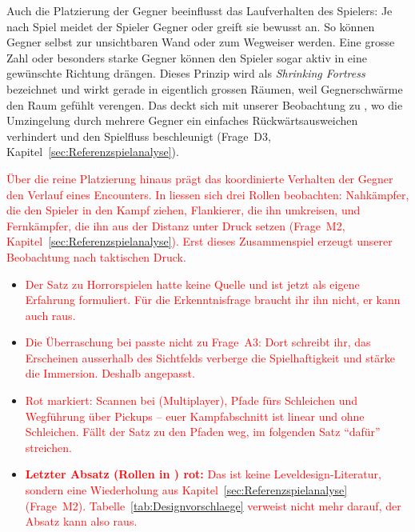 \documentclass[../Main.tex]{subfiles}
\begin{document}
Auch die Platzierung der Gegner beeinflusst das Laufverhalten des Spielers: Je nach Spiel meidet der Spieler Gegner oder greift sie bewusst an. So können Gegner selbst zur unsichtbaren Wand oder zum Wegweiser werden.\autocite[199]{totten2014architectural} Eine grosse Zahl oder besonders starke Gegner können den Spieler sogar aktiv in eine gewünschte Richtung drängen. Dieses Prinzip wird als \textit{Shrinking Fortress} bezeichnet und wirkt gerade in eigentlich grossen Räumen, weil Gegnerschwärme den Raum gefühlt verengen.\autocite[199--200]{totten2014architectural} Das deckt sich mit unserer Beobachtung zu , wo die Umzingelung durch mehrere Gegner ein einfaches Rückwärtsausweichen verhindert und den Spielfluss beschleunigt (Frage~D3, Kapitel~\ref{sec:Referenzspielanalyse}).

\textcolor{red}{Über die reine Platzierung hinaus prägt das koordinierte Verhalten der Gegner den Verlauf eines Encounters. In  liessen sich drei Rollen beobachten: Nahkämpfer, die den Spieler in den Kampf ziehen, Flankierer, die ihn umkreisen, und Fernkämpfer, die ihn aus der Distanz unter Druck setzen (Frage~M2, Kapitel~\ref{sec:Referenzspielanalyse}). Erst dieses Zusammenspiel erzeugt unserer Beobachtung nach taktischen Druck.}

\begin{itemize}[leftmargin=1.5cm]
    \item \textcolor{red}{Der Satz zu Horrorspielen hatte keine Quelle und ist jetzt als eigene Erfahrung formuliert. Für die Erkenntnisfrage braucht ihr ihn nicht, er kann auch raus.}
    \item \textcolor{red}{Die Überraschung bei  passte nicht zu Frage~A3: Dort schreibt ihr, das Erscheinen ausserhalb des Sichtfelds verberge die Spielhaftigkeit und stärke die Immersion. Deshalb angepasst.}
    \item \textcolor{red}{Rot markiert: Scannen bei  (Multiplayer), Pfade fürs Schleichen und Wegführung über Pickups -- euer Kampfabschnitt ist linear und ohne Schleichen. Fällt der Satz zu den Pfaden weg, im folgenden Satz \enquote{dafür} streichen.}
    \item \textcolor{red}{\textbf{Letzter Absatz (Rollen in ) rot:} Das ist keine Leveldesign-Literatur, sondern eine Wiederholung aus Kapitel~\ref{sec:Referenzspielanalyse} (Frage~M2). Tabelle~\ref{tab:Designvorschlaege} verweist nicht mehr darauf, der Absatz kann also raus.}
\end{itemize}
\end{document}
